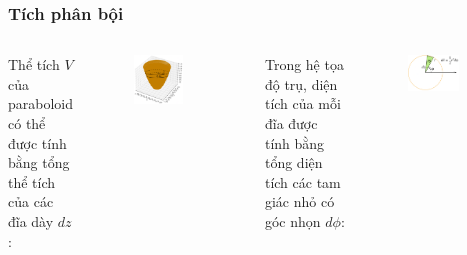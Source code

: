 \begin{frame}
\frametitle{Tích phân bội}
\begin{columns}
    Thể tích \(V\) của paraboloid có thể được tính bằng tổng thể tích của các đĩa dày \(dz\):
    \begin{figure}
        \centering
        \includegraphics[width=0.7\textwidth]{Content/Figure/discs.png}
    \end{figure}
    Trong hệ tọa độ trụ, diện tích của mỗi đĩa được tính bằng tổng diện tích các tam giác nhỏ có góc nhọn \(d\phi\):
    \begin{figure}
        \centering
        \includegraphics[width=0.8\textwidth]{Content/Figure/cylindricaldisc.png}
    \end{figure}
\end{columns}
\end{frame}

